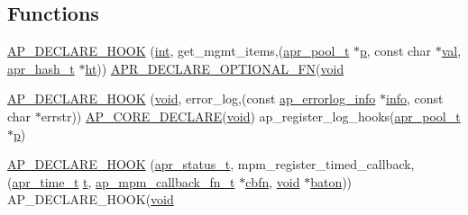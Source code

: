 \subsection*{Functions}
\begin{DoxyCompactItemize}
\item 
\hyperlink{group__hooks_ga546689ba1a2a883d321b4a905ead6246}{A\+P\+\_\+\+D\+E\+C\+L\+A\+R\+E\+\_\+\+H\+O\+OK} (\hyperlink{pcre_8txt_a42dfa4ff673c82d8efe7144098fbc198}{int}, get\+\_\+mgmt\+\_\+items,(\hyperlink{structapr__pool__t}{apr\+\_\+pool\+\_\+t} $\ast$\hyperlink{group__APACHE__CORE__MPM_ga5cd91701e5c167f2b1a38e70ab57817e}{p}, const char $\ast$\hyperlink{group__apr__tables_ga4d708cd93abeca73400ed82977502830}{val}, \hyperlink{structapr__hash__t}{apr\+\_\+hash\+\_\+t} $\ast$\hyperlink{group__apr__hash_ga18cf3e4c61221aa79a41989befa7839f}{ht})) \hyperlink{util__expr__eval_8c_a2fdb487292dbbe59e5a8470bf065d7e3}{A\+P\+R\+\_\+\+D\+E\+C\+L\+A\+R\+E\+\_\+\+O\+P\+T\+I\+O\+N\+A\+L\+\_\+\+FN}(\hyperlink{group__MOD__ISAPI_gacd6cdbf73df3d9eed42fa493d9b621a6}{void}
\item 
\hyperlink{group__hooks_gad4d03f3922cbb41275afb5573cb116cc}{A\+P\+\_\+\+D\+E\+C\+L\+A\+R\+E\+\_\+\+H\+O\+OK} (\hyperlink{group__MOD__ISAPI_gacd6cdbf73df3d9eed42fa493d9b621a6}{void}, error\+\_\+log,(const \hyperlink{structap__errorlog__info}{ap\+\_\+errorlog\+\_\+info} $\ast$\hyperlink{group__MOD__DAV_ga533561439682bae03f90d9e96eb1d30b}{info}, const char $\ast$errstr)) \hyperlink{group__MOD__CORE_ga67c82c46d8e12b9b3ccf7c96c288f207}{A\+P\+\_\+\+C\+O\+R\+E\+\_\+\+D\+E\+C\+L\+A\+RE}(\hyperlink{group__MOD__ISAPI_gacd6cdbf73df3d9eed42fa493d9b621a6}{void}) ap\+\_\+register\+\_\+log\+\_\+hooks(\hyperlink{structapr__pool__t}{apr\+\_\+pool\+\_\+t} $\ast$\hyperlink{group__APACHE__CORE__MPM_ga5cd91701e5c167f2b1a38e70ab57817e}{p})
\item 
\hyperlink{group__hooks_ga889d21b2af1aee09b616464013993522}{A\+P\+\_\+\+D\+E\+C\+L\+A\+R\+E\+\_\+\+H\+O\+OK} (\hyperlink{group__apr__errno_gaa5105fa83cc322f09382292db8b47593}{apr\+\_\+status\+\_\+t}, mpm\+\_\+register\+\_\+timed\+\_\+callback,(\hyperlink{group__apr__time_gadb4bde16055748190eae190c55aa02bb}{apr\+\_\+time\+\_\+t} \hyperlink{pcretest_8txt_a9ffb27fb8e1f90c17b13303fee2fb883}{t}, \hyperlink{group__APACHE__CORE__MPM_ga0ca31a834a87abfb20d959041aa57de0}{ap\+\_\+mpm\+\_\+callback\+\_\+fn\+\_\+t} $\ast$\hyperlink{group__APACHE__CORE__MPM_gabed6214c355f45b7a873a7db118e1dc9}{cbfn}, \hyperlink{group__MOD__ISAPI_gacd6cdbf73df3d9eed42fa493d9b621a6}{void} $\ast$\hyperlink{group__APR__Util__RC_ga37840dc44e2b0b5a127a6828fffe2a8c}{baton})) A\+P\+\_\+\+D\+E\+C\+L\+A\+R\+E\+\_\+\+H\+O\+OK(\hyperlink{group__MOD__ISAPI_gacd6cdbf73df3d9eed42fa493d9b621a6}{void}

\end{DoxyCompactItemize}
